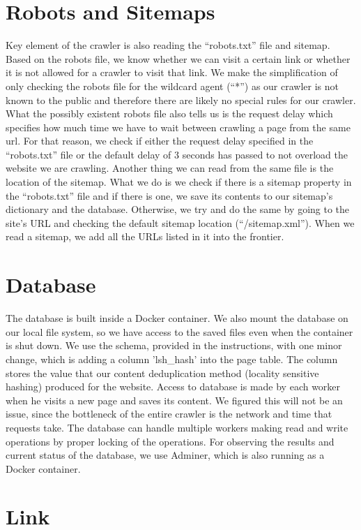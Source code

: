 \documentclass[9pt]{IEEEtran}
\begin{document}
\section{Robots and Sitemaps}\label{sec:robotsSitemaps}
Key element of the crawler is also reading the ``robots.txt'' file and sitemap. 
Based on the robots file, we know whether we can visit a certain link or whether it is not allowed for a crawler to visit that link.
We make the simplification of only checking the robots file for the wildcard agent (``*'') as our crawler is not known to the public and therefore there are likely no special rules for our crawler.
What the possibly existent robots file also tells us is the request delay which specifies how much time we have to wait between crawling a page from the same url.
For that reason, we check if either the request delay specified in the ``robots.txt'' file or the default delay of 3 seconds has passed to not overload the website we are crawling.
Another thing we can read from the same file is the location of the sitemap.
What we do is we check if there is a sitemap property in the ``robots.txt'' file and if there is one, we save its contents to our sitemap's dictionary and the database. Otherwise, we try and do the same by going to the site's URL and checking the default sitemap location (``/sitemap.xml'').
When we read a sitemap, we add all the URLs listed in it into the frontier. 


\section{Database}\label{sec:database}
The database is built inside a Docker container.
We also mount the database on our local file system, so we have access to the saved files even when the container is shut down.
We use the schema, provided in the instructions, with one minor change, which is adding a column 'lsh\_hash' into the page table. 
The column stores the value that our content deduplication method (locality sensitive hashing) produced for the website. 
Access to database is made by each worker when he visits a new page and saves its content.
We figured this will not be an issue, since the bottleneck of the entire crawler is the network and time that requests take.
The database can handle multiple workers making read and write operations by proper locking of the operations.
For observing the results and current status of the database, we use Adminer, which is also running as a Docker container.

\section{Link}\label{sec:Links}
\end{document}
